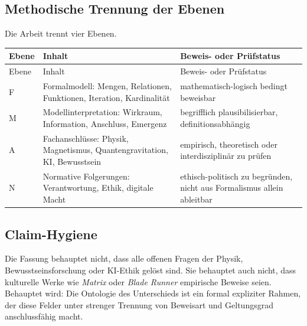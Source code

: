 \documentclass[11pt,a4paper]{article}
\theoremstyle{remark}
\begin{document}
\subsection{Methodische Trennung der Ebenen}
Die Arbeit trennt vier Ebenen.

\begin{longtable}{>{\raggedright\arraybackslash}p{}p{}p{}}
\toprule
Ebene & Inhalt & Beweis- oder Prüfstatus \\
\midrule
\endfirsthead
\toprule
Ebene & Inhalt & Beweis- oder Prüfstatus \\
\midrule
\endhead
F & Formalmodell: Mengen, Relationen, Funktionen, Iteration, Kardinalität & mathematisch-logisch bedingt beweisbar \\
M & Modellinterpretation: Wirkraum, Information, Anschluss, Emergenz & begrifflich plausibilisierbar, definitionsabhängig \\
A & Fachanschlüsse: Physik, Magnetismus, Quantengravitation, KI, Bewusstsein & empirisch, theoretisch oder interdisziplinär zu prüfen \\
N & Normative Folgerungen: Verantwortung, Ethik, digitale Macht & ethisch-politisch zu begründen, nicht aus Formalismus allein ableitbar \\
\bottomrule
\end{longtable}

\subsection{Claim-Hygiene}
Die Fassung behauptet nicht, dass alle offenen Fragen der Physik, Bewusstseinsforschung oder KI-Ethik gelöst sind. Sie behauptet auch nicht, dass kulturelle Werke wie \emph{Matrix} oder \emph{Blade Runner} empirische Beweise seien. Behauptet wird: Die Ontologie des Unterschieds ist ein formal expliziter Rahmen, der diese Felder unter strenger Trennung von Beweisart und Geltungsgrad anschlussfähig macht.
\end{document}
